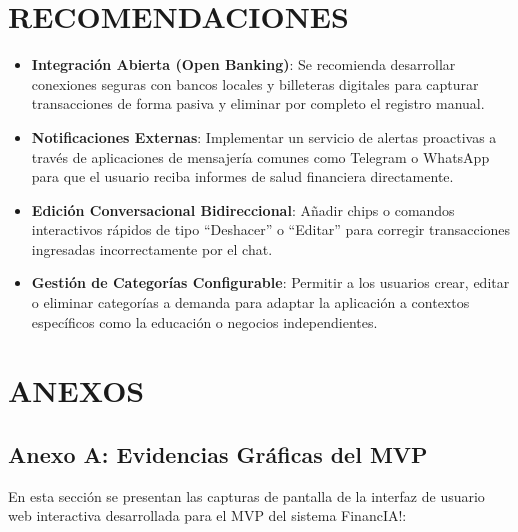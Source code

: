 \documentclass[12pt]{article}
\begin{document}
\section*{RECOMENDACIONES}
\begin{itemize}
    \item \textbf{Integración Abierta (Open Banking)}: Se recomienda desarrollar conexiones seguras con bancos locales y billeteras digitales para capturar transacciones de forma pasiva y eliminar por completo el registro manual.
    \item \textbf{Notificaciones Externas}: Implementar un servicio de alertas proactivas a través de aplicaciones de mensajería comunes como Telegram o WhatsApp para que el usuario reciba informes de salud financiera directamente.
    \item \textbf{Edición Conversacional Bidireccional}: Añadir chips o comandos interactivos rápidos de tipo ``Deshacer'' o ``Editar'' para corregir transacciones ingresadas incorrectamente por el chat.
    \item \textbf{Gestión de Categorías Configurable}: Permitir a los usuarios crear, editar o eliminar categorías a demanda para adaptar la aplicación a contextos específicos como la educación o negocios independientes.
\end{itemize}

\newpage

\renewcommand{\refname}{REFERENCIAS BIBLIOGRÁFICAS}



\newpage

\section*{ANEXOS}

\subsection*{Anexo A: Evidencias Gráficas del MVP}
En esta sección se presentan las capturas de pantalla de la interfaz de usuario web interactiva desarrollada para el MVP del sistema FinancIA!:
\end{document}
